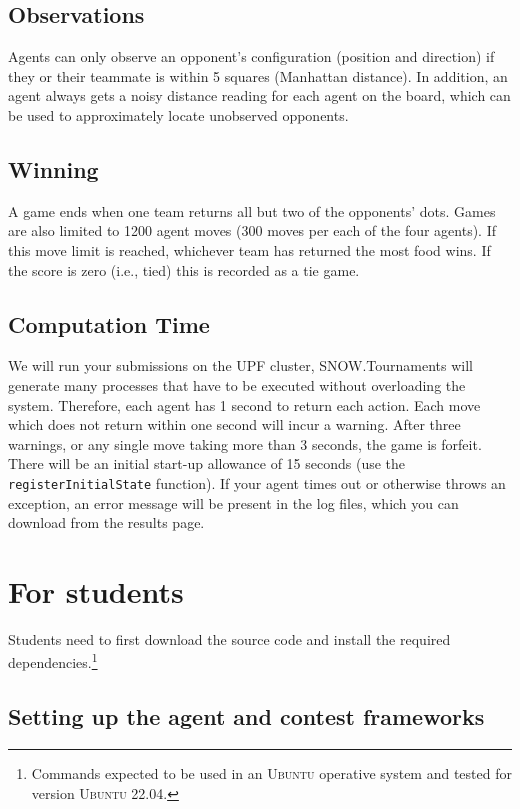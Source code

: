 \documentclass[11pt]{article}
\begin{document}
\subsection{Observations}
Agents can only observe an opponent's configuration (position and direction) if they or their teammate is within 5 squares (Manhattan distance). In addition, an agent always gets a noisy distance reading for each agent on the board, which can be used to approximately locate unobserved opponents.

\subsection{Winning}
A game ends when one team returns all but two of the opponents' dots. Games are also limited to 1200 agent moves (300 moves per each of the four agents). If this move limit is reached, whichever team has returned the most food wins. If the score is zero (i.e., tied) this is recorded as a tie game.

\subsection{Computation Time}
We will run your submissions on the UPF cluster, SNOW.Tournaments will generate many processes that have to be executed without overloading the system. Therefore,  each agent has 1 second to return each action. Each move which does not return within one second will incur a warning. After three warnings, or any single move taking more than 3 seconds, the game is forfeit. There will be an initial start-up allowance of 15 seconds (use the \texttt{registerInitialState} function). If your agent times out or otherwise throws an exception, an error message will be present in the log files, which you can download from the results page.


\section{For students}
\label{sec:students}

Students need to first download the source code and install the required dependencies.\footnote{Commands expected to be used in an \textsc{Ubuntu} operative system and tested for version \textsc{Ubuntu 22.04}.}

\subsection{Setting up the agent and contest frameworks}
\end{document}
